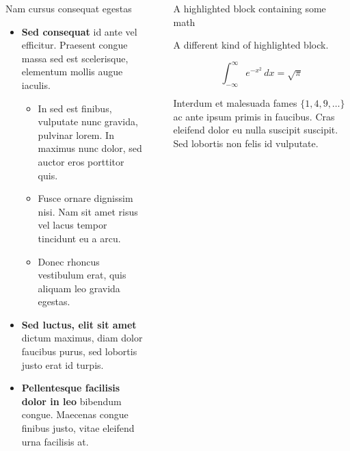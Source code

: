 \documentclass[final]{beamer}
\newlength{\sepwidth}
\newlength{\colwidth}
\newcommand{\separatorcolumn}{\begin{column}{\sepwidth}\end{column}}
\begin{document}
\begin{frame}[t]
\begin{columns}[t]
\begin{column}{\colwidth}
\begin{block}{Nam cursus consequat egestas}
                \begin{itemize}
                    \item \textbf{Sed consequat} id ante vel efficitur. Praesent congue massa
                          sed est scelerisque, elementum mollis augue iaculis.
                          \begin{itemize}
                              \item In sed est finibus, vulputate
                                    nunc gravida, pulvinar lorem. In maximus nunc dolor, sed auctor eros
                                    porttitor quis.
                              \item Fusce ornare dignissim nisi. Nam sit amet risus vel lacus
                                    tempor tincidunt eu a arcu.
                              \item Donec rhoncus vestibulum erat, quis aliquam leo
                                    gravida egestas.
                          \end{itemize}
                    \item \textbf{Sed luctus, elit sit amet} dictum maximus, diam dolor
                          faucibus purus, sed lobortis justo erat id turpis.
                    \item \textbf{Pellentesque facilisis dolor in leo} bibendum congue.
                          Maecenas congue finibus justo, vitae eleifend urna facilisis at.
                \end{itemize}

            \end{block}

        \end{column}

        \separatorcolumn

        \begin{column}{\colwidth}

            \begin{exampleblock}{A highlighted block containing some math}

                A different kind of highlighted block.

                $$
                    \int_{-\infty}^{\infty} e^{-x^2}\,dx = \sqrt{\pi}
                $$

                Interdum et malesuada fames $\{1, 4, 9, \ldots\}$ ac ante ipsum primis in
                faucibus. Cras eleifend dolor eu nulla suscipit suscipit. Sed lobortis non
                felis id vulputate.


\end{exampleblock}
\end{column}
\end{columns}
\end{frame}
\end{document}
